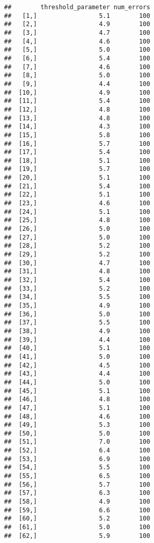 \documentclass[
]{article}
\begin{document}
\begin{verbatim}
##        threshold_parameter num_errors
##   [1,]                 5.1        100
##   [2,]                 4.9        100
##   [3,]                 4.7        100
##   [4,]                 4.6        100
##   [5,]                 5.0        100
##   [6,]                 5.4        100
##   [7,]                 4.6        100
##   [8,]                 5.0        100
##   [9,]                 4.4        100
##  [10,]                 4.9        100
##  [11,]                 5.4        100
##  [12,]                 4.8        100
##  [13,]                 4.8        100
##  [14,]                 4.3        100
##  [15,]                 5.8        100
##  [16,]                 5.7        100
##  [17,]                 5.4        100
##  [18,]                 5.1        100
##  [19,]                 5.7        100
##  [20,]                 5.1        100
##  [21,]                 5.4        100
##  [22,]                 5.1        100
##  [23,]                 4.6        100
##  [24,]                 5.1        100
##  [25,]                 4.8        100
##  [26,]                 5.0        100
##  [27,]                 5.0        100
##  [28,]                 5.2        100
##  [29,]                 5.2        100
##  [30,]                 4.7        100
##  [31,]                 4.8        100
##  [32,]                 5.4        100
##  [33,]                 5.2        100
##  [34,]                 5.5        100
##  [35,]                 4.9        100
##  [36,]                 5.0        100
##  [37,]                 5.5        100
##  [38,]                 4.9        100
##  [39,]                 4.4        100
##  [40,]                 5.1        100
##  [41,]                 5.0        100
##  [42,]                 4.5        100
##  [43,]                 4.4        100
##  [44,]                 5.0        100
##  [45,]                 5.1        100
##  [46,]                 4.8        100
##  [47,]                 5.1        100
##  [48,]                 4.6        100
##  [49,]                 5.3        100
##  [50,]                 5.0        100
##  [51,]                 7.0        100
##  [52,]                 6.4        100
##  [53,]                 6.9        100
##  [54,]                 5.5        100
##  [55,]                 6.5        100
##  [56,]                 5.7        100
##  [57,]                 6.3        100
##  [58,]                 4.9        100
##  [59,]                 6.6        100
##  [60,]                 5.2        100
##  [61,]                 5.0        100
##  [62,]                 5.9        100

\end{verbatim}
\end{document}
